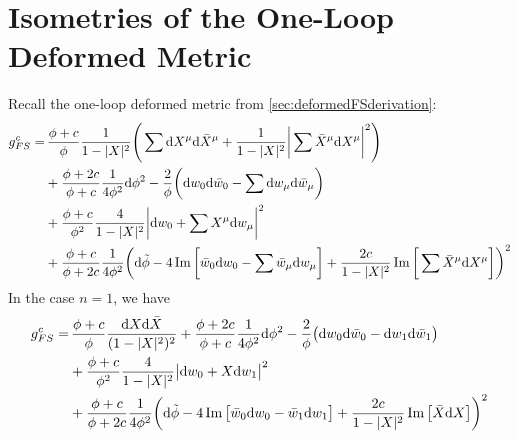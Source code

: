 \section{Isometries of the One-Loop Deformed Metric}

Recall the one-loop deformed metric from \cref{sec:deformedFSderivation}:
\begin{align*}
	g_{FS}^c=&\,\frac{\phi+c}{\phi}\frac{1}{1-\lvert X \rvert^2}\Bigg(\sum \mathrm{d} X^\mu \mathrm{d} \bar X^\mu 
	+ \frac{1}{1-\lvert X \rvert^2}\bigg|\sum \bar X^\mu \mathrm{d} X^\mu \bigg|^2\Bigg)\\
	&+\frac{\phi+2c}{\phi+c}\frac{1}{4\phi^2}\mathrm{d} \phi^2 
	-\frac{2}{\phi} \bigg( \mathrm{d} w_0 \mathrm{d} \bar w_0 - \sum \mathrm{d} w_\mu \mathrm{d} \bar w_\mu \bigg)\\
	&+\frac{\phi+c}{\phi^2}\frac{4}{1-\lvert X \rvert^2}\bigg|\mathrm{d} w_0 + \sum X^\mu \mathrm{d} w_\mu \bigg|^2\\
	&+\frac{\phi+c}{\phi+2c}\frac{1}{4\phi^2}\bigg(\mathrm{d}\tilde\phi
	-4\operatorname{Im}\bigg[\bar w_0\mathrm{d} w_0 - \sum \bar w_\mu \mathrm{d} w_\mu\bigg]
	+\frac{2c}{1-\lvert X \rvert^2}\operatorname{Im}\bigg[\sum \bar X^\mu \mathrm{d} X^\mu\bigg]\bigg)^2
\end{align*}
In the case $n=1$, we have
\begin{align*}
	g_{FS}^c=&\,\frac{\phi+c}{\phi}\frac{\mathrm{d} X \mathrm{d} \bar X}{(1-\lvert X \rvert^2)^2}
	+\frac{\phi+2c}{\phi+c}\frac{1}{4\phi^2}\mathrm{d} \phi^2 
	-\frac{2}{\phi} \big( \mathrm{d} w_0 \mathrm{d} \bar w_0 - \mathrm{d} w_1 \mathrm{d} \bar w_1 \big)\\
	&+\frac{\phi+c}{\phi^2}\frac{4}{1-\lvert X \rvert^2}\big|\mathrm{d} w_0 + X \mathrm{d} w_1 \big|^2\\
	&+\frac{\phi+c}{\phi+2c}\frac{1}{4\phi^2}\bigg(\mathrm{d}\tilde\phi
	-4\operatorname{Im}\big[\bar w_0\mathrm{d} w_0 - \bar w_1 \mathrm{d} w_1\big]
	+\frac{2c}{1-\lvert X \rvert^2}\operatorname{Im}\big[ \bar X \mathrm{d} X\big]\bigg)^2
\end{align*}

